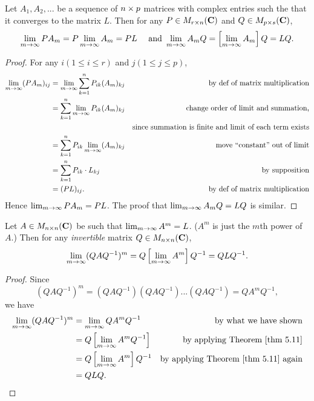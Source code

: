 \begin{theorem} \label{thm 5.11}
Let \(A_1, A_2, ...\) be a sequence of \(n \times p\) matrices with complex entries such the that it converges to the matrix \(L\).
Then for any \(P \in M_{r \times n}(\mathbf{C})\) and \(Q \in M_{p \times s}(\mathbf{C})\),
\[
    \lim_{m \to \infty} PA_m = P \lim_{m \to \infty} A_m = PL \quad \text{ and } \lim_{m \to \infty} A_m Q = \left[\lim_{m \to \infty} A_m\right] Q = LQ.
\]
\end{theorem}

\begin{proof}
For any \(i (1 \le i \le r)\) and \(j (1 \le j \le p)\),
\begin{align*}
    \lim_{m \to \infty} (PA_m)_{ij} & = \lim_{m \to \infty} \sum_{k = 1}^n P_{ik} (A_m)_{kj} & \text{by def of matrix multiplication} \\
        & = \sum_{k = 1}^n \lim_{m \to \infty} P_{ik} (A_m)_{kj} & \text{change order of limit and summation,} \\
        & & \text{since summation is finite and limit of each term exists} \\
        & = \sum_{k = 1}^n P_{ik} \lim_{m \to \infty} (A_m)_{kj} & \text{move ``constant'' out of limit} \\
        & = \sum_{k = 1}^n P_{ik} \cdot L_{kj} & \text{by supposition} \\
        & = (PL)_{ij}. & \text{by def of matrix multiplication}
\end{align*}
Hence \(\lim_{m \to \infty} PA_m = PL\).
The proof that \(\lim_{m \to \infty} A_m Q = LQ\) is similar.
\end{proof}

\begin{corollary} \label{corollary 5.11.1}
Let \(A \in M_{n \times n}(\mathbf{C})\) be such that \(\lim_{m \to \infty} A^m = L\).
(\(A^m\) is just the \(m\)th power of \(A\).)
Then for any \emph{invertible} matrix \(Q \in M_{n \times n}(\mathbf{C})\),
\[
    \lim_{m \to \infty} (Q A Q^{-1})^m = Q \left[ \lim_{m \to \infty} A^m \right] Q^{-1} = Q L Q^{-1}.
\]
\end{corollary}

\begin{proof}
Since
\[
    (Q A Q^{-1})^m = (Q A Q^{-1})(Q A Q^{-1})...(Q A Q^{-1}) = Q A^m Q^{-1},
\]
we have
\begin{align*}
    \lim_{m \toINF} (Q A Q^{-1})^m & = \lim_{m \toINF} Q A^m Q^{-1} & \text{by what we have shown} \\
        & = Q \left[ \lim_{m \toINF} A^m Q^{-1} \right] & \text{by applying \THM{5.11}} \\
        & = Q \left[\lim_{m \toINF} A^m \right] Q^{-1} & \text{by applying \THM{5.11} again} \\
        & = Q L Q.
\end{align*}
\end{proof}

